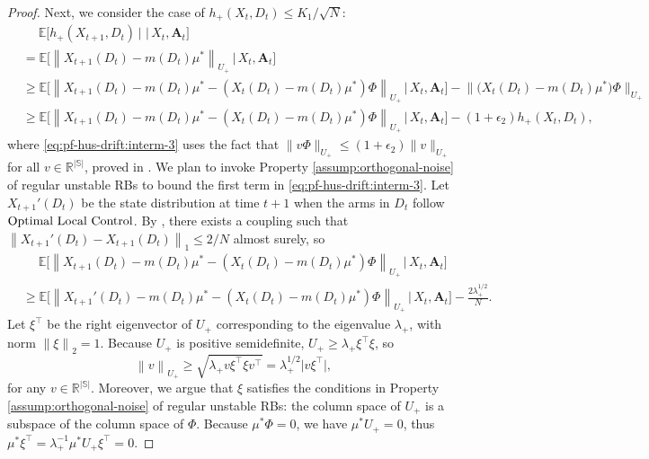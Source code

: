 \documentclass[11pt,letterpaper]{article}
\theoremstyle{plain}
\theoremstyle{definition}
\theoremstyle{remark}
\newcommand{\norm}[1]{\left\lVert#1\right\rVert}
\newcommand{\normplain}[1]{\lVert#1\rVert}
\newcommand{\normbig}[1]{\big\lVert#1\big\rVert}
\newcommand{\Ebig}[1]{\mathbb{E}\big[#1\big]}
\newcommand{\givenbig}{\,\big|\,}
\newcommand{\R}{\mathbb{R}}
\newcommand{\absplain}[1]{\lvert#1\rvert}
\newcommand{\ve}[1]{\bm{#1}}
\newcommand{\veA}{\ve{A}}
\newcommand{\sspa}{\mathbb{S}}
\newcommand{\lppriority}{\textup{Optimal Local Control}}
\newcommand{\statdist}{\mu^*}
\newcommand{\gapusmax}{\epsilon_2}
\newcommand{\subus}{+}%
\newcommand{\Uus}{U_{\subus}}
\newcommand{\hus}{h_{\subus}}
\newcommand{\lamus}{\lambda_{\subus}}
\begin{document}
\begin{proof}
    Next, we consider the case of $\hus(X_t, D_t) \leq K_1 / \sqrt{N}$: 
    \begin{align}
        \nonumber
        &\mspace{23mu} \Ebig{\hus(X_{t+1}, D_t) \givenbig \givenbig X_t, \veA_t}  \\
        \nonumber
        &=  \Ebig{\norm{X_{t+1}(D_t) - m(D_t) \statdist}_{\Uus}  \givenbig X_t, \veA_t} \\
        \nonumber
        &\geq \Ebig{\norm{X_{t+1}(D_t) - m(D_t) \statdist - (X_t(D_t)-m(D_t) \statdist)\Phi}_{\Uus}  \givenbig X_t, \veA_t} - \normbig{\big(X_t(D_t) - m(D_t)\statdist\big)\Phi}_{\Uus} \\
        \label{eq:pf-hus-drift:interm-3}
        &\geq \Ebig{\norm{X_{t+1}(D_t) - m(D_t) \statdist - (X_t(D_t) - m(D_t)\statdist)\Phi}_{\Uus}  \givenbig X_t, \veA_t} - (1+\gapusmax) \hus(X_t, D_t), 
    \end{align}
    where \eqref{eq:pf-hus-drift:interm-3} uses the fact that $\normplain{v \Phi}_{\Uus} \leq (1+\gapusmax) \normplain{v}_{\Uus}$ for all $v\in \R^{|\sspa|}$, proved in . 
    We plan to invoke Property \ref{assump:orthogonal-noise} of regular unstable RBs to bound the first term in \eqref{eq:pf-hus-drift:interm-3}. 
    Let $X_{t+1}'(D_t)$ be the state distribution at time $t+1$ when the arms in $D_t$ follow $\lppriority$. By , there exists a coupling such that $\norm{X_{t+1}'(D_t) - X_{t+1}(D_t)}_1 \leq 2/N$ almost surely, so
    \begin{align}
        \nonumber
        &\mspace{23mu} \Ebig{\norm{X_{t+1}(D_t) - m(D_t) \statdist - (X_t(D_t) - m(D_t)\statdist)\Phi}_{\Uus}  \givenbig X_t, \veA_t} \\
        \label{eq:pf-hus-drift:interm-4}
        &\geq \Ebig{\norm{X_{t+1}'(D_t) - m(D_t) \statdist - (X_t(D_t) - m(D_t)\statdist)\Phi}_{\Uus}  \givenbig X_t, \veA_t} - \frac{2\lamus^{1/2}}{N}.
    \end{align}
    Let $\xi^\top$ be the right eigenvector of $\Uus$ corresponding to the eigenvalue $\lamus$, with norm $\norm{\xi}_2 = 1$. 
    Because $\Uus$ is positive semidefinite, $\Uus \geq \lamus\xi^\top \xi$, so 
    \[
        \norm{v}_{\Uus} \geq \sqrt{\lamus v\xi^\top \xi v^\top} = \lamus^{1/2} \absplain{v\xi^\top},
    \]
    for any $v\in \R^{|\sspa|}$. 
    Moreover, we argue that $\xi$ satisfies the conditions in Property \ref{assump:orthogonal-noise} of regular unstable RBs: the column space of $\Uus$ is a subspace of the column space of $\Phi$. Because $\statdist \Phi = 0$, we have $\statdist \Uus = 0$, thus $\statdist \xi^\top = \lamus^{-1} \statdist \Uus \xi^\top = 0$. 

\end{proof}
\end{document}
